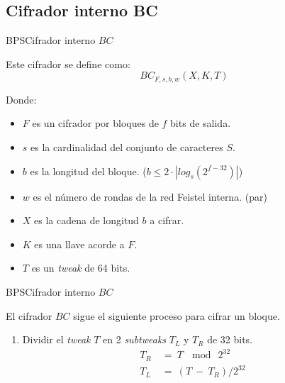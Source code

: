 %
%

\subsection{Cifrador interno BC}

\begin{frame}{BPS}{Cifrador interno $BC$}

  Este cifrador se define como:
    \begin{equation*}
      BC_{F,s,b,w}(X,K,T)
    \end{equation*}

  Donde:
  \begin{itemize}
    \item $F$ es un cifrador por bloques de $f$ bits de salida.
    \item $s$ es la cardinalidad del conjunto de caracteres $S$.
    \item $b$ es la longitud del bloque. ($b \leq 2 \cdot |log_s(2^{f-32})|$)
    \item $w$ es el número de rondas de la red Feistel interna. (par)
    \item $X$ es la cadena de longitud $b$ a cifrar.
    \item $K$ es una llave acorde a $F$.
    \item $T$ es un \textit{tweak} de 64 bits.
  \end{itemize}

\end{frame}

\begin{frame}{BPS}{Cifrador interno $BC$}

  El cifrador $BC$ sigue el siguiente proceso para cifrar un bloque.

  \begin{enumerate}
    \item Dividir el \textit{tweak} $T$ en 2 \textit{subtweaks} $T_L$ y $T_R$
    de 32 bits.
      \begin{align*}
        T_R\: &=\: T\: \mod\: 2^{32}  \\
        T_L\: &=\: (T\: -\: T_R) / 2^{32}
      \end{align*}
  \end{enumerate}

\end{frame}

